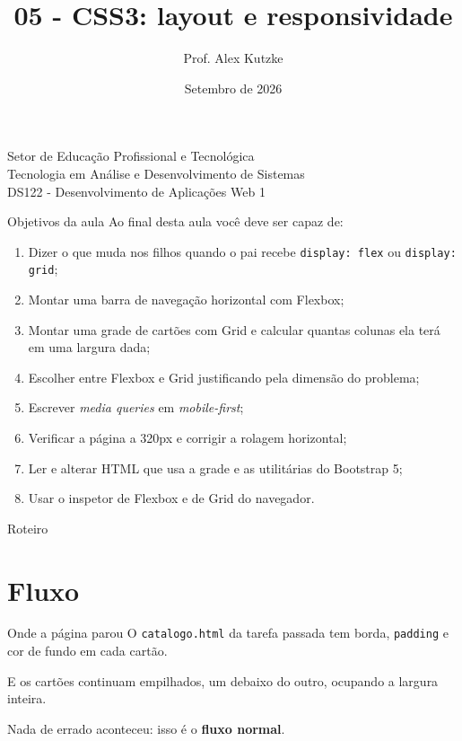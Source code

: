 \documentclass{beamer}
\title{05 - CSS3: layout e responsividade}
\author{Prof. Alex Kutzke}
\date{Setembro de 2026}
\begin{document}
\begin{frame}
	\begin{center}
		\large{Setor de Educação Profissional e Tecnológica}\\
		Tecnologia em Análise e Desenvolvimento de Sistemas\\
		\vspace{1cm}
		\small{DS122 - Desenvolvimento de Aplicações Web 1}
	\end{center}
	\titlepage
\end{frame}

\begin{frame}{Objetivos da aula}
	Ao final desta aula você deve ser capaz de:
	\begin{enumerate}
		\item Dizer o que muda nos filhos quando o pai recebe \texttt{display: flex}
		      ou \texttt{display: grid};
		\item Montar uma barra de navegação horizontal com Flexbox;
		\item Montar uma grade de cartões com Grid e calcular quantas colunas ela
		      terá em uma largura dada;
		\item Escolher entre Flexbox e Grid justificando pela dimensão do problema;
		\item Escrever \emph{media queries} em \emph{mobile-first};
		\item Verificar a página a 320px e corrigir a rolagem horizontal;
		\item Ler e alterar HTML que usa a grade e as utilitárias do Bootstrap 5;
		\item Usar o inspetor de Flexbox e de Grid do navegador.
	\end{enumerate}
\end{frame}

\begin{frame}{Roteiro}
	\tableofcontents
\end{frame}

\section{Fluxo}

\begin{frame}{Onde a página parou}
	O \texttt{catalogo.html} da tarefa passada tem borda, \texttt{padding} e cor
	de fundo em cada cartão.

	\vspace{0.3cm}
	E os cartões continuam empilhados, um debaixo do outro, ocupando a largura
	inteira.

	\vspace{0.5cm}
	Nada de errado aconteceu: isso é o \textbf{fluxo normal}.
\end{frame}
\end{document}
